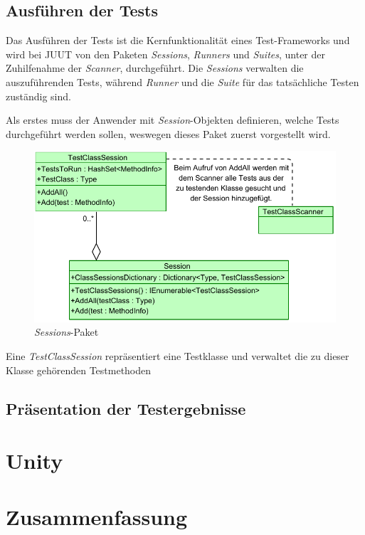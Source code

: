 \subsection{Ausführen der Tests}

Das Ausführen der Tests ist die Kernfunktionalität eines Test-Frameworks und wird bei JUUT von den Paketen \textit{Sessions}, \textit{Runners} und \textit{Suites}, unter der Zuhilfenahme der \textit{Scanner}, durchgeführt. Die \textit{Sessions} verwalten die auszuführenden Tests, während \textit{Runner} und die \textit{Suite} für das tatsächliche Testen zuständig sind.

Als erstes muss der Anwender mit \textit{Session}-Objekten definieren, welche Tests durchgeführt werden sollen, weswegen dieses Paket zuerst vorgestellt wird.

\begin{figure}[h]
\centering
\includegraphics[width=0.8\linewidth]{images/Kapitel_Ergebnis/Sessions}
\caption[\textit{Sessions}-Paket]{\textit{Sessions}-Paket}
\label{fig:Sessions}
\end{figure}

Eine \textit{TestClassSession} repräsentiert eine Testklasse und verwaltet die zu dieser Klasse gehörenden Testmethoden

\subsection{Präsentation der Testergebnisse}

\section{Unity}

\section{Zusammenfassung}